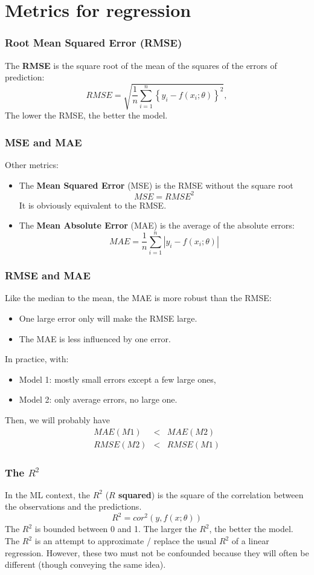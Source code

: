 \section{Metrics for regression}
\begin{frame}
\frametitle{Root Mean Squared Error (RMSE)}
The {\bf RMSE} is the square root of the mean of the squares of the errors of prediction:
$$
RMSE = \sqrt{\frac{1}{n} \sum_{i=1}^n \left\{y_i - f(x_i;\theta)\right\}^2},
$$
The lower the RMSE, the better the model.
\end{frame}
\begin{frame}
\frametitle{MSE and MAE}
Other metrics:
\begin{itemize}
\item The {\bf Mean Squared Error} (MSE) is the RMSE without the square root
$$
MSE = RMSE^2
$$
It is obviously equivalent to the RMSE.
\item The {\bf Mean Absolute Error} (MAE) is the average of the absolute errors:
$$
MAE = \frac{1}{n}\sum_{i=1}^n|y_i -f(x_i;\theta)|
$$
\end{itemize}
\end{frame}
\begin{frame}
\frametitle{RMSE and MAE}
Like the median to the mean, the MAE is more robust than the RMSE:
\begin{itemize}
\item One large error only will make the RMSE large.
\item The MAE is less influenced by one error.
\end{itemize}
In practice, with:
\begin{itemize}
\item Model 1: mostly small errors except a few large ones,
\item Model 2: only average errors, no large one.
\end{itemize}
Then, we will probably have
\begin{eqnarray*}
MAE(M1) &<& MAE(M2)\\
RMSE(M2) &<& RMSE(M1)
\end{eqnarray*}
\end{frame}
\begin{frame}[fragile]
\frametitle{The $R^2$}
In the ML context, the $R^2$ ({\bf $R$ squared}) is the square of the correlation between the observations and the predictions. 
$$
R^2 = cor^2(y,f(x;\theta))
$$
The $R^2$ is bounded between 0 and 1. The larger the $R^2$, the better the model.\\
\vspace{0.3cm}
The $R^2$ is an attempt to approximate / replace the usual $R^2$ of a linear regression. However, these two must not be confounded because they will often be different (though conveying the same idea).
\end{frame}
